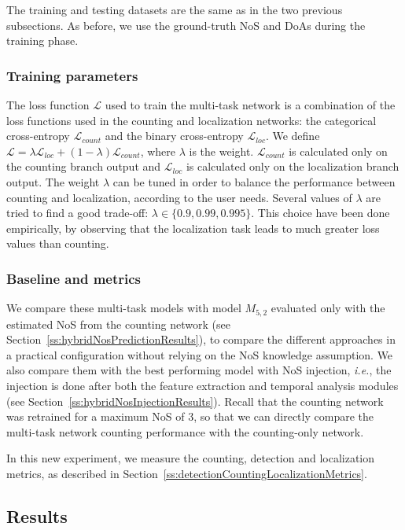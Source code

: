 The training and testing datasets are the same as in the two previous subsections. As before, we use the ground-truth NoS and DoAs during the training phase.

\subsubsection{Training parameters}

The loss function $\mathcal{L}$ used to train the multi-task network is a combination of the loss functions used in the counting and localization networks: the categorical cross-entropy $\mathcal{L}_{count}$ and the binary cross-entropy $\mathcal{L}_{loc}$. We define $\mathcal{L} = \lambda \mathcal{L}_{loc} + (1-\lambda) \mathcal{L}_{count}$, where $\lambda$ is the weight. $\mathcal{L}_{count}$ is calculated only on the counting branch output and $\mathcal{L}_{loc}$ is calculated only on the localization branch output. The weight $\lambda$ can be tuned in order to balance the performance between counting and localization, according to the user needs. Several values of $\lambda$ are tried to find a good trade-off: $\lambda \in \{0.9, 0.99, 0.995\}$. This choice have been done empirically, by observing that the localization task leads to much greater loss values than counting.

\subsubsection{Baseline and metrics}

We compare these multi-task models with model $M_{5,2}$ evaluated only with the estimated NoS from the counting network (see Section~\ref{ss:hybridNosPredictionResults}), to compare the different approaches in a practical configuration without relying on the NoS knowledge assumption. We also compare them with the best performing model with NoS injection, \emph{i.e.}, the injection is done after both the feature extraction and temporal analysis modules (see Section~\ref{ss:hybridNosInjectionResults}). Recall that the counting network was retrained for a maximum NoS of $3$, so that we can directly compare the multi-task network counting performance with the counting-only network.

In this new experiment, we measure the counting, detection and localization metrics, as described in Section~\ref{ss:detectionCountingLocalizationMetrics}.

\subsection{Results}
